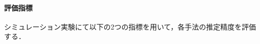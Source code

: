 \documentclass[dvipdfmx,a4j]{jarticle}
\begin{document}
%
%


\paragraph{評価指標}

シミュレーション実験にて以下の2つの指標を用いて，各手法の推定精度を評価する．
\end{document}
